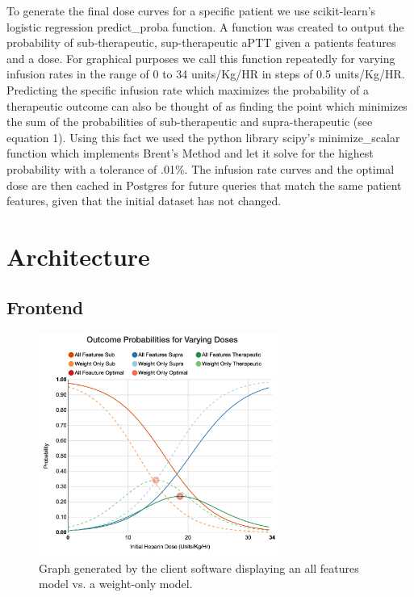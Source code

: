\documentclass[12pt,a4paper,]{report}
\begin{document}
To generate the final dose curves for a specific patient we use
scikit-learn's logistic regression predict\_proba function. A function
was created to output the probability of sub-therapeutic,
sup-therapeutic aPTT given a patients features and a dose. For graphical
purposes we call this function repeatedly for varying infusion rates in
the range of 0 to 34 units/Kg/HR in steps of 0.5 units/Kg/HR. Predicting
the specific infusion rate which maximizes the probability of a
therapeutic outcome can also be thought of as finding the point which
minimizes the sum of the probabilities of sub-therapeutic and
supra-therapeutic (see equation 1). Using this fact we used the python
library scipy's minimize\_scalar function which implements Brent's
Method and let it solve for the highest probability with a tolerance of
.01\%. The infusion rate curves and the optimal dose are then cached in
Postgres for future queries that match the same patient features, given
that the initial dataset has not changed.

\section{Architecture}\label{architecture}

\subsection{Frontend}\label{frontend}

\begin{figure}
\centering
\includegraphics[width=0.7\textwidth]{source/figures/calc_graph.png}
\caption{\label{fig:calc_graph}Graph generated by the client software displaying an all features model vs. a weight-only model.}
\end{figure}
\end{document}
